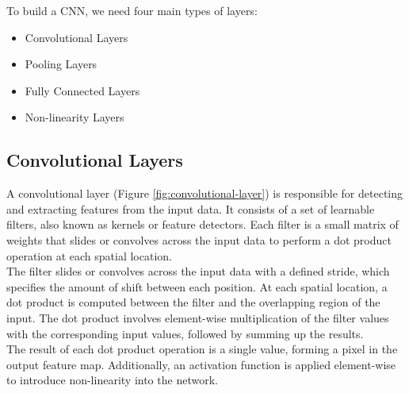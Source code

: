 To build a CNN, we need four main types of layers:

\begin{itemize}
  \item Convolutional Layers
  \item Pooling Layers
  \item Fully Connected Layers
  \item Non-linearity Layers
\end{itemize}

\subsection{Convolutional Layers}

A convolutional layer (Figure \ref{fig:convolutional-layer}) is
responsible for detecting and extracting features from the input data. It
consists of a set of learnable filters, also known as kernels or feature
detectors. Each filter is a small matrix of weights that slides or convolves
across the input data to perform a dot product operation at each spatial
location.  \\

The filter slides or convolves across the input data with a defined stride,
which specifies the amount of shift between each position. At each spatial
location, a dot product is computed between the filter and the overlapping
region of the input. The dot product involves element-wise multiplication of
the filter values with the corresponding input values, followed by summing up
the results. \\

The result of each dot product operation is a single value, forming a pixel in
the output feature map. Additionally, an activation function is applied
element-wise to introduce non-linearity into the network.

